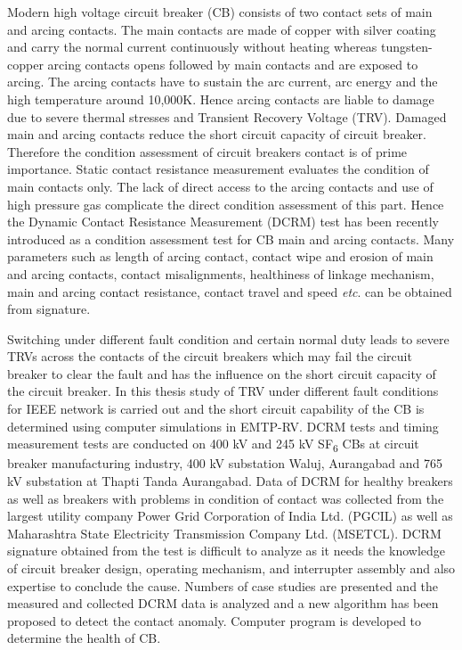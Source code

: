 Modern high voltage circuit breaker (CB) consists of two contact sets of main and arcing contacts. The main contacts are made of copper with silver coating and carry the normal current continuously without heating whereas tungsten-copper arcing contacts opens followed by main contacts and are exposed to arcing. The arcing contacts have to sustain the arc current, arc energy and the high temperature around 10,000\textdegree K. Hence arcing contacts are liable to damage due to severe thermal stresses and Transient Recovery Voltage (TRV). Damaged main and arcing contacts reduce the short circuit capacity of circuit breaker. Therefore the condition assessment of circuit breakers contact is of prime importance. Static contact resistance measurement evaluates the condition of main contacts only. The lack of direct access to the arcing contacts and use of high pressure gas complicate the direct condition assessment of this part. Hence the Dynamic Contact Resistance Measurement (DCRM) test has been recently introduced as a condition assessment test for CB main and arcing contacts. Many parameters such as length of arcing contact, contact wipe and erosion of main and arcing contacts, contact misalignments, healthiness of linkage mechanism, main and arcing contact resistance, contact travel and speed \textit{etc}. can be obtained from signature.

Switching under different fault condition and certain normal duty leads to severe TRVs across the contacts of the circuit breakers which may fail the circuit breaker to clear the fault and has the influence on the short circuit capacity of the circuit breaker. In this thesis study of TRV under different fault conditions for IEEE network is carried out and the short circuit capability of the CB is determined using computer simulations in EMTP-RV. DCRM tests and timing measurement tests are conducted on 400 kV and 245 kV SF\textsubscript{6} CBs at circuit breaker manufacturing industry, 400 kV substation Waluj, Aurangabad and 765 kV substation at Thapti Tanda Aurangabad. Data of DCRM for healthy breakers as well as breakers with problems in condition of contact was collected from the largest utility company Power Grid Corporation of India Ltd. (PGCIL) as well as Maharashtra State Electricity Transmission Company Ltd. (MSETCL). DCRM signature obtained from the test is difficult to analyze as it needs the knowledge of circuit breaker design, operating mechanism, and interrupter assembly and also expertise to conclude the cause. Numbers of case studies are presented and the measured and collected DCRM data is analyzed and a new algorithm has been proposed to detect the contact anomaly. Computer program is developed to determine the health of CB.
